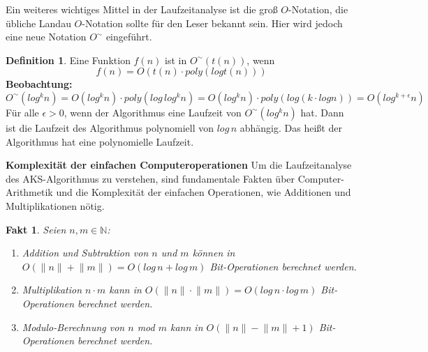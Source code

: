 \documentclass[12pt,oneside]{article}
\newtheorem{fact}[theorem]{Fakt}
\theoremstyle{remark}
\theoremstyle{definition}
\newtheorem{definition}{Definition}[section]
\begin{document}
Ein weiteres wichtiges Mittel in der Laufzeitanalyse ist die groß $O$-Notation, die übliche Landau $O$-Notation sollte für den Leser bekannt sein. Hier wird jedoch eine neue Notation $O^{\sim}$ eingeführt. 
\begin{definition}
Eine Funktion $f(n)$ ist in $ O^{\sim}(t(n))$, wenn
\begin{equation}
    f(n) = O(t(n) \cdot poly(log t(n)))
\end{equation}
\textbf{\small{Beobachtung:}}
\begin{equation}
    O^{\sim}(log^k n) = O(log^k n) \cdot poly(log \, log^k n) = O(log^k n) \cdot poly(log( k \cdot log n)) = O(log^{k+\epsilon}n)
\end{equation}
Für alle $\epsilon > 0$, wenn der Algorithmus eine Laufzeit von $O^{\sim}(log^k n)$ hat. Dann ist die Laufzeit des Algorithmus  polynomiell von $log \, n$ abhängig. Das heißt der Algorithmus hat eine polynomielle Laufzeit.
\end{definition}

\smallskip

\textbf{\normalsize{Komplexität der einfachen Computeroperationen}}\newline
Um die Laufzeitanalyse des AKS-Algorithmus zu verstehen, sind fundamentale Fakten über Computer-Arithmetik und die Komplexität der einfachen Operationen, wie Additionen und Multiplikationen nötig.

\begin{fact}\label{fact_1}
Seien $n,m \in \mathbb{N}$:\newline
\begin{enumerate}
    \item Addition und Subtraktion von $n$ und $m$ können in $O(\lVert n \rVert + \lVert m \rVert) = O(log \, n + log \, m)$ Bit-Operationen berechnet werden.\newline
    \item Multiplikation $ n \cdot m$ kann in $O(\lVert n \rVert \cdot \lVert m \rVert) = O(log \, n \cdot log \, m)$ Bit-Operationen berechnet werden.\newline
    \item Modulo-Berechnung von $n$ mod $m$ kann in $O(\lVert n \rVert - \lVert m \rVert + 1)$ Bit-Operationen berechnet werden.\newline\newline
\end{enumerate}
\end{fact}
\end{document}
